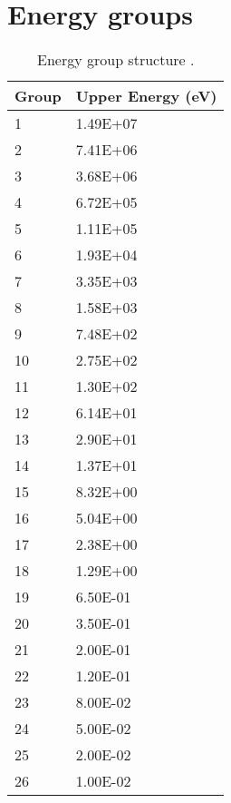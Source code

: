 \documentclass[11pt,letterpaper]{article}
\begin{document}
\section{Energy groups}

\begin{table}[htbp!]
  \centering
    \caption{Energy group structure \cite{gougar_prismatic_2010}.}
  \begin{tabular}{ll}
    \toprule
  Group   & Upper Energy (eV) \\ \midrule
  1   & 1.49E+07      \\
  2   & 7.41E+06      \\
  3   & 3.68E+06      \\
  4   & 6.72E+05      \\
  5   & 1.11E+05      \\
  6   & 1.93E+04      \\
  7   & 3.35E+03      \\
  8   & 1.58E+03      \\
  9   & 7.48E+02      \\
  10    & 2.75E+02      \\
  11    & 1.30E+02      \\
  12    & 6.14E+01      \\
  13    & 2.90E+01      \\
  14    & 1.37E+01      \\
  15    & 8.32E+00      \\
  16    & 5.04E+00      \\
  17    & 2.38E+00      \\
  18    & 1.29E+00      \\
  19    & 6.50E-01      \\
  20    & 3.50E-01      \\
  21    & 2.00E-01      \\
  22    & 1.20E-01      \\
  23    & 8.00E-02      \\
  24    & 5.00E-02      \\
  25    & 2.00E-02      \\
  26    & 1.00E-02      \\
    \bottomrule
  \end{tabular}
    \label{tab:energygroups}
\end{table}





\pagebreak


\end{document}
